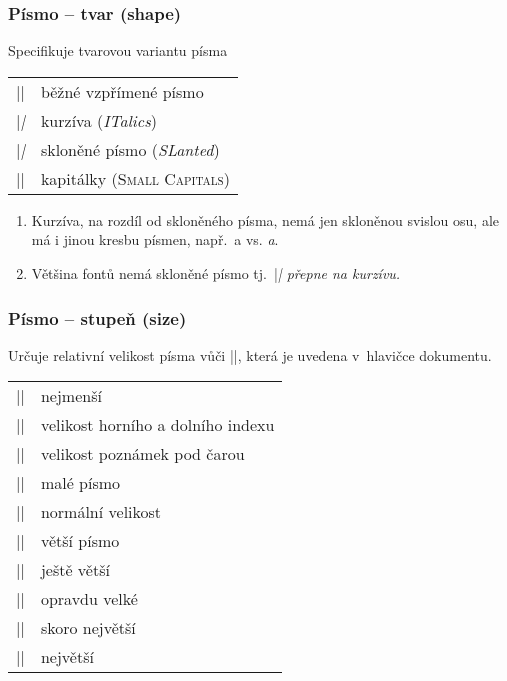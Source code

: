 \begin{frame}[fragile]
	\frametitle{Písmo -- tvar (shape)}
	Specifikuje tvarovou variantu písma
	\begin{center}
		\begin{tabular}{cl}
			|\upshape| & běžné vzpřímené písmo\\
			|\itshape| & kurzíva (\textit{ITalics})\\
			|\slshape| & skloněné písmo (\textsl{SLanted})\\
			|\scshape| & kapitálky (\textsc{Small Capitals})\\
		\end{tabular}
	\end{center}
	\begin{remark}
		\begin{enumerate}
			\item Kurzíva, na rozdíl od skloněného písma, nemá jen skloněnou svislou osu, ale má i jinou kresbu písmen, např.\ \textrm{\huge{}a} vs. \textit{\huge{}a}.
			\item Většina fontů nemá skloněné písmo tj.\ |\slshape| přepne na kurzívu.
		\end{enumerate}
	\end{remark}
\end{frame}


\begin{frame}[fragile]
	\frametitle{Písmo -- stupeň (size)}
	Určuje relativní velikost písma vůči |\normalsize|, která je uvedena v~hlavičce dokumentu.
	\begin{center}
		\begin{tabular}{cl}
			|\tiny| & {\tiny{}nejmenší}\\
			|\scriptsize| & {\scriptsize{}velikost horního a dolního indexu}\\
			|\footnotesize| & {\footnotesize{}velikost poznámek pod čarou}\\
			|\small| & {\small{}malé písmo}\\
			|\normalsize| & {\normalsize{}normální velikost}\\
			|\large| & {\large{}větší písmo}\\
			|\Large| & {\Large{}ještě větší}\\
			|\LARGE| & {\LARGE{}opravdu velké}\\
			|\huge| & {\huge{}skoro největší}\\
			|\Huge| & {\Huge{}největší}\\
		\end{tabular}
	\end{center}
\end{frame}


